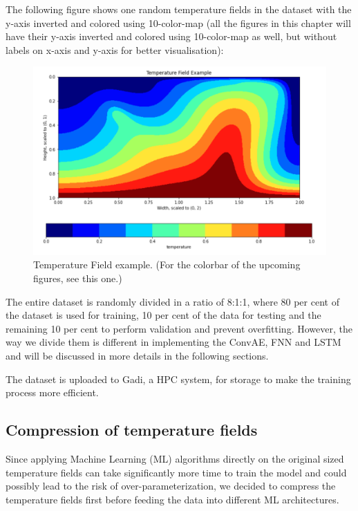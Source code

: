 The following figure shows one random temperature fields in the dataset with the y-axis inverted and colored using 10-color-map (all the figures in this chapter will have their y-axis inverted and colored using 10-color-map as well, but without labels on x-axis and y-axis for better visualisation):

\begin{figure}[H]
    \caption{Temperature Field example. (For the colorbar of the upcoming figures, see this one.)}
    \includegraphics[scale=0.6]{figures/mantle_convection_images/temperature_field_example.png}
\end{figure}

The entire dataset is randomly divided in a ratio of 8:1:1, where 80 per cent of the dataset is used for training, 10 per cent of the data for testing and the remaining 10 per cent to perform validation and prevent overfitting. However, the way we divide them is different in implementing the ConvAE, FNN and LSTM and will be discussed in more details in the following sections.

The dataset is uploaded to Gadi, a HPC system, for storage to make the training process more efficient. 

\subsection{Compression of temperature fields}

Since applying Machine Learning (ML) algorithms directly on the original sized temperature fields can take significantly more time to train the model and could possibly lead to the risk of over-parameterization, we decided to compress the temperature fields first before feeding the data into different ML architectures.

